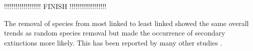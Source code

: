 \documentclass[12pt,a4paper]{article}
\begin{document}

%



!!!!!!!!!!!!!!!!!!! FINISH !!!!!!!!!!!!!!!!!!!

The removal of species from most linked to least linked showed the same overall trends as random species removal but made the occurrence of secondary extinctions more likely. This has been reported by many other studies \parencite{Memmott2004, Kaiser-Bunbury2010, Traveset2017, Bastazini2018, Vizentin-Bugoni2019, Biella2020}. 
\end{document}
